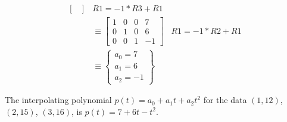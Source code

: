 \documentclass{../mathhomework}
\begin{document}
\begin{problem}[1.2\#33]
\begin{solution}
\begin{align*}
\begin{bmatrix}
            \end{bmatrix}
            & R1 = -1 * R3 + R1 \\ & \equiv
            \begin{bmatrix}
                1 & 0 & 0 & 7 \\
                0 & 1 & 0 & 6 \\
                0 & 0 & 1 & -1
            \end{bmatrix}
            & R1 = -1 * R2 + R1 \\ & \equiv
            \begin{Bmatrix}
                a_0 = 7 \\
                a_1 = 6 \\
                a_2 = -1
            \end{Bmatrix}
        \end{align*}
    
        The interpolating polynomial $p(t) = a_0 + a_1t + a_2t^2$ for the data $(1,12)$, $(2,15)$, $(3,16)$, is $p(t) = 7 + 6t - t^2$.
    \end{solution}
\end{problem}
\end{document}
